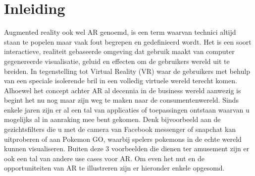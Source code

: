 
\chapter{Inleiding}
\label{ch:inleiding}


Augmented reality ook wel AR genoemd, is een term waarvan technici altijd staan te popelen maar vaak fout begrepen en gedefinieerd wordt. Het is een soort interactieve, realiteit gebaseerde omgeving dat gebruik maakt van computer gegenereerde visualisatie, geluid en effecten om de gebruikers wereld uit te breiden. In tegenstelling tot Virtual Reality (VR) waar de gebruikers met behulp van een speciale isolerende bril in een volledig virtuele wereld terecht komen. Alhoewel het concept achter AR al decennia in de business wereld aanwezig is begint het nu nog maar zijn weg te maken naar de consumentenwereld. Sinds enkele jaren zijn er al een tal van applicaties of toepassingen ontstaan waarvan u mogelijks al in aanraking mee bent gekomen. Denk bijvoorbeeld aan de gezichtsfilters die u met de camera van Facebook messenger of snapchat kan uitproberen of aan Pokemon GO, waarbij spelers pokemons in de echte wereld kunnen visualiseren. Buiten deze 3 voorbeelden die dienen ter amusement zijn er ook een tal van andere use cases voor AR. Om even het nut en de opportuniteiten van AR te illustreren zijn er hieronder enkele opgesomd. 


